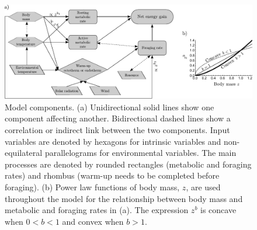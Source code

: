 \clearpage

\begin{figure}
\includegraphics[width=\textwidth]{fig1}
\caption{
    \setstretch{\stretchby}
    Model components.
    (a) Unidirectional solid lines show one component affecting another.
    Bidirectional dashed lines show a correlation or indirect link between the two components.
    Input variables are denoted by hexagons for intrinsic variables and non-equilateral parallelograms for environmental variables.
    The main processes are denoted by rounded rectangles (metabolic and foraging rates) and rhombus (warm-up needs to be completed before foraging).
    (b) Power law functions of body mass, $z$, are used throughout the model for the relationship between body mass and metabolic and foraging rates in (a).
    The expression $z^b$ is concave when $0 < b < 1$ and convex when $b > 1$.
}
\label{fig1}
\end{figure}

